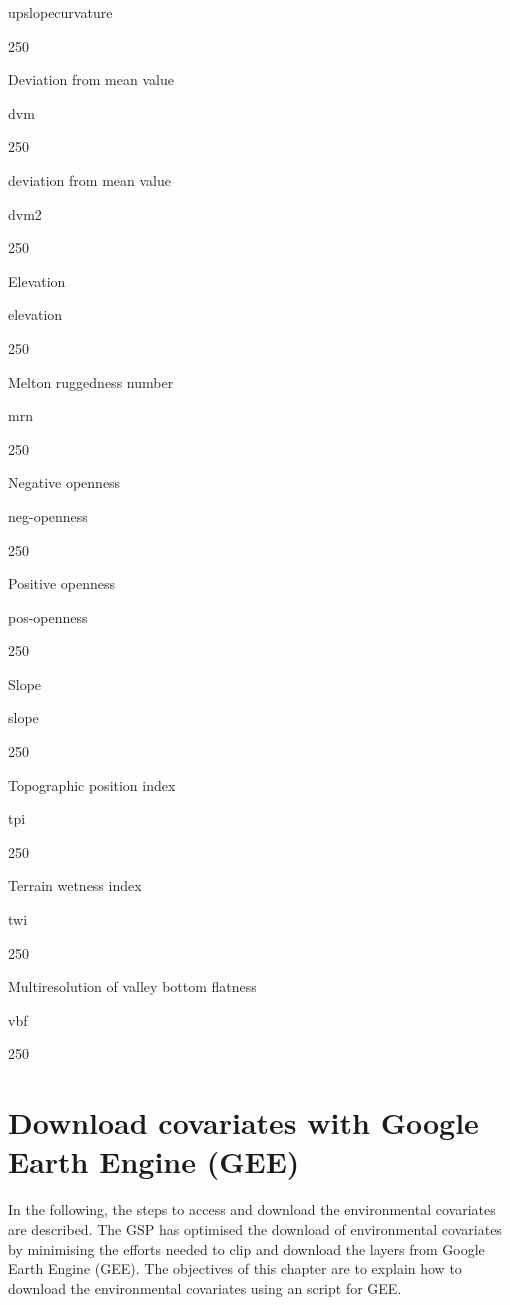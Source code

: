 \documentclass[
  10pt,
  b5paper,
  oneside]{book}
\begin{document}
upslopecurvature

250

Deviation from mean value

dvm

250

deviation from mean value

dvm2

250

Elevation

elevation

250

Melton ruggedness number

mrn

250

Negative openness

neg-openness

250

Positive openness

pos-openness

250

Slope

slope

250

Topographic position index

tpi

250

Terrain wetness index

twi

250

Multiresolution of valley bottom flatness

vbf

250

\hypertarget{download-covariates-with-google-earth-engine-gee}{%
\section{Download covariates with Google Earth Engine (GEE)}\label{download-covariates-with-google-earth-engine-gee}}

In the following, the steps to access and download the environmental covariates are described. The GSP has optimised the download of environmental covariates by minimising the efforts needed to clip and download the layers from Google Earth Engine (GEE). The objectives of this chapter are to explain how to download the environmental covariates using an script for GEE.
\end{document}
